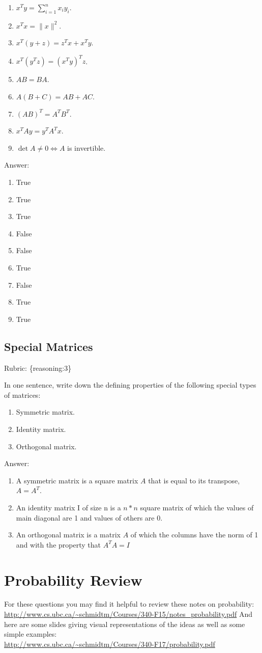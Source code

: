 \documentclass{article}
\def\rubric#1{\gre{Rubric: \{#1\}}}{}
\def\blu#1{{\color{blu}#1}}
\def\gre#1{{\color{gre}#1}}
\def\norm#1{\|#1\|}
\def\enum#1{\begin{enumerate}#1\end{enumerate}}
\begin{document}
\begin{enumerate}
\item $x^Ty = \sum_{i=1}^n x_iy_i$.
\item $x^Tx = \norm{x}^2$.
\item $x^T(y+z) = z^Tx + x^Ty$.
\item $x^T(y^Tz) = (x^Ty)^Tz$.
\item $AB=BA$.
\item $A(B + C) = AB + AC$.
\item $(AB)^T = A^TB^T$.
\item $x^TAy = y^TA^Tx$.
\item $\det A \neq 0 \iff A$ is invertible.
\end{enumerate}
\textcolor{gre}{
Answer:
\enum{
\item True
\item True
\item True
\item False
\item False
\item True
\item False
\item True
\item True
}
}

\subsection{Special Matrices}
\rubric{reasoning:3}

\blu{In one sentence, write down the defining properties of the following special types of matrices}:
\enum{
\item Symmetric matrix.
\item Identity matrix.
\item Orthogonal matrix.
}
\textcolor{gre}{
Answer:
\enum{
\item A symmetric matrix is a square matrix $A$ that is equal to its transpose, $A=A^T$.
\item An identity matrix I of size n is a $n*n$ square matrix of which the values of main diagonal are 1 and values of others are 0.
\item An orthogonal matrix is a matrix $A$ of which the columns have the norm of 1 and with the property that $A^TA=I$
}
}
\section{Probability Review}


For these questions you may find it helpful to review these notes on probability:\\
\url{http://www.cs.ubc.ca/~schmidtm/Courses/340-F15/notes_probability.pdf}
And here are some slides giving visual representations of the ideas as well as some simple examples:\\
\url{http://www.cs.ubc.ca/~schmidtm/Courses/340-F17/probability.pdf}
\end{document}
